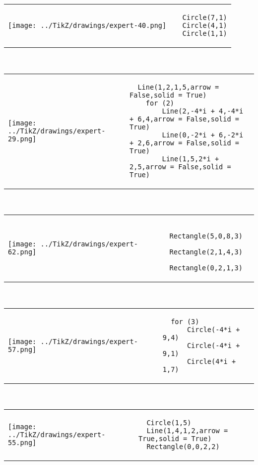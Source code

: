         \begin{tabular}{ll}
\texttt{[image: ../TikZ/drawings/expert-40.png]}&
        \begin{minipage}{10cm}
        \begin{verbatim}
  Circle(7,1)
  Circle(4,1)
  Circle(1,1)
        \end{verbatim}
\end{minipage}
\end{tabular}        
        \\

        \begin{tabular}{ll}
\texttt{[image: ../TikZ/drawings/expert-29.png]}&
        \begin{minipage}{10cm}
        \begin{verbatim}
  Line(1,2,1,5,arrow = False,solid = True)
    for (2)
        Line(2,-4*i + 4,-4*i + 6,4,arrow = False,solid = True)
        Line(0,-2*i + 6,-2*i + 2,6,arrow = False,solid = True)
        Line(1,5,2*i + 2,5,arrow = False,solid = True)
        \end{verbatim}
\end{minipage}
\end{tabular}        
        \\

        \begin{tabular}{ll}
\texttt{[image: ../TikZ/drawings/expert-62.png]}&
        \begin{minipage}{10cm}
        \begin{verbatim}
  Rectangle(5,0,8,3)
  Rectangle(2,1,4,3)
  Rectangle(0,2,1,3)
        \end{verbatim}
\end{minipage}
\end{tabular}        
        \\

        \begin{tabular}{ll}
\texttt{[image: ../TikZ/drawings/expert-57.png]}&
        \begin{minipage}{10cm}
        \begin{verbatim}
  for (3)
      Circle(-4*i + 9,4)
      Circle(-4*i + 9,1)
      Circle(4*i + 1,7)
        \end{verbatim}
\end{minipage}
\end{tabular}        
        \\

        \begin{tabular}{ll}
\texttt{[image: ../TikZ/drawings/expert-55.png]}&
        \begin{minipage}{10cm}
        \begin{verbatim}
  Circle(1,5)
  Line(1,4,1,2,arrow = True,solid = True)
  Rectangle(0,0,2,2)
        \end{verbatim}
\end{minipage}
\end{tabular}        
        \\

